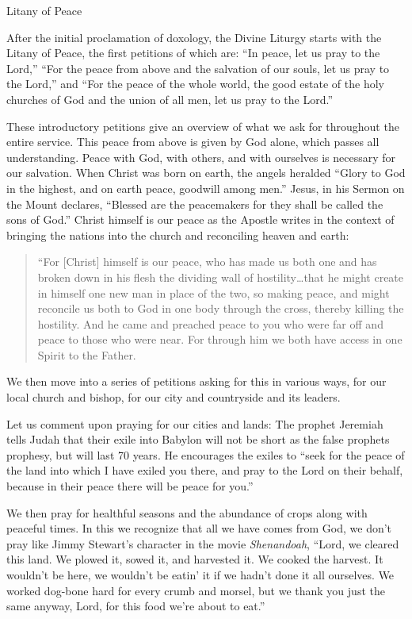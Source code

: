 \documentclass[
]{article}
\newcommand{\RL}[1]{\beginR #1\endR}
\begin{document}
Litany of Peace

After the initial proclamation of doxology, the Divine Liturgy starts
with the Litany of Peace, the first petitions of which are: ``In peace,
let us pray to the Lord,'' ``For the peace from above and the salvation
of our souls, let us pray to the Lord,'' and ``For the peace of the
whole world, the good estate of the holy churches of God and the union
of all men, let us pray to the Lord.''

These introductory petitions give an overview of what we ask for
throughout the entire service. This peace from above is given by God
alone, which passes all understanding. Peace with God, with others, and
with ourselves is necessary for our salvation. When Christ was born on
earth, the angels heralded ``Glory to God in the highest, and on earth
peace, goodwill among men.'' Jesus, in his Sermon on the Mount declares,
``Blessed are the peacemakers for they shall be called the sons of
God.'' Christ himself is our peace as the Apostle writes in the context
of bringing the nations into the church and reconciling heaven and
earth:

\begin{quote}
``For {[}Christ{]} himself is our peace, who has made us both one and
has broken down in his flesh the dividing wall of hostility\ldots that
he might create in himself one new man in place of the two, so making
peace, and might reconcile us both to God in one body through the cross,
thereby killing the hostility. And he came and preached peace to you who
were far off and peace to those who were near. For through him we both
have access in one Spirit to the Father.
\end{quote}

We then move into a series of petitions asking for this in various ways,
for our local church and bishop, for our city and countryside and its
leaders.

Let us comment upon praying for our cities and lands: The prophet
Jeremiah tells Judah that their exile into Babylon will not be short as
the false prophets prophesy, but will last 70 years. He encourages the
exiles to ``seek for the peace of the land into which I have exiled you
there, and pray to the Lord on their behalf, because in their peace
there will be peace for you.''

We then pray for healthful seasons and the abundance of crops along with
peaceful times. In this we recognize that all we have comes from God, we
don't pray like Jimmy Stewart's character in the movie
\emph{Shenandoah}, ``Lord, we cleared this land. We plowed it, sowed it,
and harvested it. We cooked the harvest. It wouldn\RL{'}t be here, we
wouldn\RL{'}t be eatin\RL{'} it if we hadn\RL{'}t done it all ourselves.
We worked dog-bone hard for every crumb and morsel, but we thank you
just the same anyway, Lord, for this food we\RL{'}re about to eat.''
\end{document}
